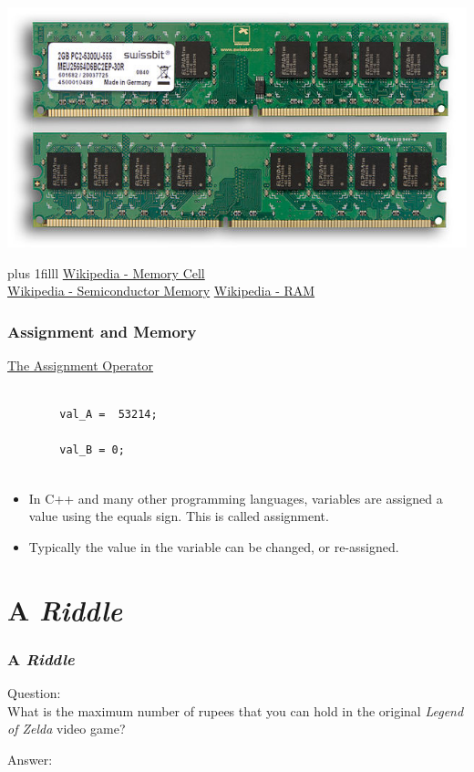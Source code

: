\documentclass[fleqn]{beamer} %
\newcommand{\sectiontitleIII}{Assignment and Memory}
\newcommand{\sectiontitleIV}{A {\it Riddle} }
\newcommand{\btVFill}{\vskip0pt plus 1filll}
\begin{document}
\begin{frame}
		\includegraphics[scale=.50]{ramstick.jpg}
		
		\btVFill
		\href{https://en.wikipedia.org/wiki/Memory_cell_(computing)}{Wikipedia - Memory Cell} \\
		\href{https://en.wikipedia.org/wiki/Semiconductor_memory}{Wikipedia - Semiconductor Memory}
		\href{https://en.wikipedia.org/wiki/Random-access_memory}{Wikipedia - RAM}

	\end{frame}

	\begin{frame}[containsverbatim] \small
	\frametitle{\sectiontitleIII}

	\underline{The Assignment Operator} \vspace{5mm} \\

	\begin{lstlisting}
	
		val_A =  53214;
	
		val_B = 0;
	
	\end{lstlisting}
	
	\begin{itemize}
		\item In C++ and many other programming languages, variables are assigned a value using the equals sign. This is called {\BL assignment}.
		\item Typically the value in the variable can be changed, or re-assigned. 
		
	\end{itemize}
	
	
	\end{frame}


\section{\sectiontitleIV}	
	\begin{frame}[label=sectionIV] \small
		\frametitle{\sectiontitleIV}    
		
		Question: \vspace{5mm}\\ What is the maximum number of rupees that you can hold in the original {\it Legend of Zelda} video game? 
		\vspace{25mm}
		
		Answer:

	\end{frame}
\end{document}
